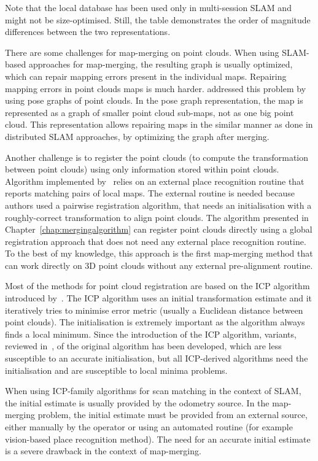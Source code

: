 Note that the local database has been used only in multi-session \gls{SLAM} and might not be size-optimised. Still, the table demonstrates the order of magnitude differences between the two representations.

There are some challenges for map-merging on point clouds. When using \gls{SLAM}-based approaches for map-merging, the resulting graph is usually optimized, which can repair mapping errors present in the individual maps. Repairing mapping errors in point clouds maps is much harder. \citet{bonanni2017pose} addressed this problem by using pose graphs of point clouds. In the pose graph representation, the map is represented as a graph of smaller point cloud sub-maps, not as one big point cloud. This representation allows repairing maps in the similar manner as done in distributed \gls{SLAM} approaches, by optimizing the graph after merging.

Another challenge is to register the point clouds (to compute the transformation between point clouds) using only information stored within point clouds. Algorithm implemented by~\citet{bonanni2017pose} relies on an external place recognition routine that reports matching pairs of local maps. The external routine is needed because authors used a pairwise registration algorithm, that needs an initialisation with a roughly-correct transformation to align point clouds. The algorithm presented in Chapter~\ref{chap:mergingalgorithm} can register point clouds directly using a global registration approach that does not need any external place recognition routine. To the best of my knowledge, this approach is the first map-merging method
that can work directly on \gls{3D} point clouds without any external pre-alignment routine.

Most of the methods for point cloud registration are based on the \gls{ICP} algorithm introduced by~\citet{besl1992icp}. The \gls{ICP} algorithm uses an initial transformation estimate and it iteratively tries to minimise error metric (usually a Euclidean distance between point clouds). The initialisation is extremely important as the algorithm always finds a local minimum. Since the introduction of the \gls{ICP} algorithm, variants, reviewed in~\citet{pomerleau2015reviewregistration}, of the original algorithm has been developed, which are less susceptible to an accurate initialisation, but all \gls{ICP}-derived algorithms need the initialisation and are susceptible to local minima problems.

When using \gls{ICP}-family algorithms for scan matching in the context of \gls{SLAM}, the initial estimate is usually provided by the odometry source. In the map-merging problem, the initial estimate must be provided from an external source, either manually by the operator or using an automated routine (for example vision-based place recognition method). The need for an accurate initial estimate is a severe drawback in the context of map-merging.

